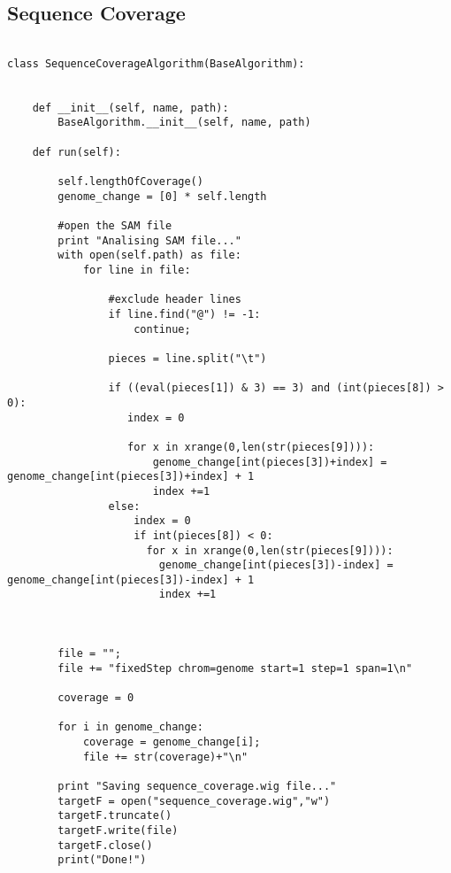 \subsection{Sequence Coverage}
\tiny
\begin{verbatim}

class SequenceCoverageAlgorithm(BaseAlgorithm):


    def __init__(self, name, path):
        BaseAlgorithm.__init__(self, name, path)

    def run(self):

        self.lengthOfCoverage()
        genome_change = [0] * self.length

        #open the SAM file
        print "Analising SAM file..."
        with open(self.path) as file:
            for line in file:

                #exclude header lines
                if line.find("@") != -1:
                    continue;

                pieces = line.split("\t")

                if ((eval(pieces[1]) & 3) == 3) and (int(pieces[8]) > 0):
                   index = 0

                   for x in xrange(0,len(str(pieces[9]))):
                       genome_change[int(pieces[3])+index] = genome_change[int(pieces[3])+index] + 1
                       index +=1
                else:
                    index = 0
                    if int(pieces[8]) < 0:
                      for x in xrange(0,len(str(pieces[9]))):
                        genome_change[int(pieces[3])-index] = genome_change[int(pieces[3])-index] + 1
                        index +=1



        file = "";
        file += "fixedStep chrom=genome start=1 step=1 span=1\n"

        coverage = 0

        for i in genome_change:
            coverage = genome_change[i];
            file += str(coverage)+"\n"

        print "Saving sequence_coverage.wig file..."
        targetF = open("sequence_coverage.wig","w")
        targetF.truncate()
        targetF.write(file)
        targetF.close()
        print("Done!")
\end{verbatim}


\newpage
